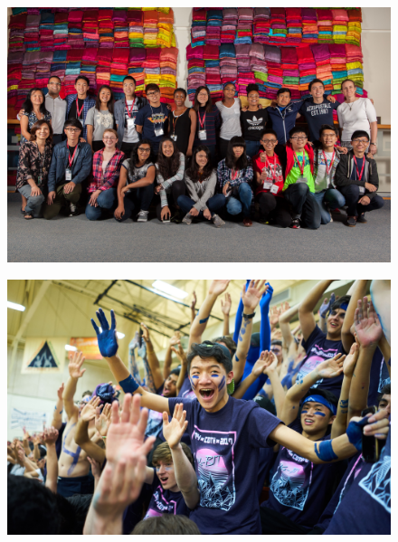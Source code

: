 \documentclass{report}
\begin{document}
\begin{landscape}
  \begin{figure}
    \centering
    \includegraphics[height=\textheight]{res/group_taiwan.jpg}
  \end{figure}
\end{landscape}

\begin{landscape}
  \begin{figure}
    \centering
    \includegraphics[height=\textheight]{res/event_simon.jpg}
  \end{figure}
\end{landscape}
\end{document}
